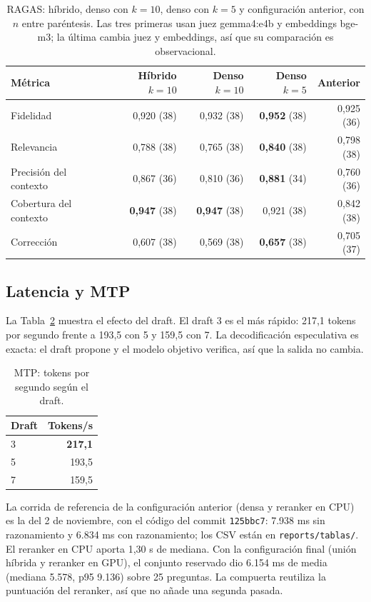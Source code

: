 \begin{table}[t]
\centering
\footnotesize
\caption{RAGAS: h\'ibrido, denso con $k=10$, denso con $k=5$ y configuraci\'on anterior, con $n$ entre par\'entesis. Las tres primeras usan juez gemma4:e4b y embeddings bge-m3; la \'ultima cambia juez y embeddings, as\'i que su comparaci\'on es observacional.}
\label{tab:ragas}
\begin{tabular}{lrrrr}
\toprule
M\'etrica & H\'ibrido $k=10$ & Denso $k=10$ & Denso $k=5$ & Anterior \\
\midrule
Fidelidad & 0,920 (38) & 0,932 (38) & \textbf{0,952} (38) & 0,925 (36) \\
Relevancia & 0,788 (38) & 0,765 (38) & \textbf{0,840} (38) & 0,798 (38) \\
Precisi\'on del contexto & 0,867 (36) & 0,810 (36) & \textbf{0,881} (34) & 0,760 (36) \\
Cobertura del contexto & \textbf{0,947} (38) & \textbf{0,947} (38) & 0,921 (38) & 0,842 (38) \\
Correcci\'on & 0,607 (38) & 0,569 (38) & \textbf{0,657} (38) & 0,705 (37) \\
\bottomrule
\end{tabular}
\end{table}

\subsection{Latencia y MTP}

La Tabla~\ref{tab:mtp} muestra el efecto del draft. El draft 3 es el m\'as r\'apido: 217,1 tokens por segundo frente a 193,5 con 5 y 159,5 con 7. La decodificaci\'on especulativa es exacta: el draft propone y el modelo objetivo verifica, as\'i que la salida no cambia.

\begin{table}[t]
\centering
\footnotesize
\caption{MTP: tokens por segundo seg\'un el draft.}
\label{tab:mtp}
\begin{tabular}{lr}
\toprule
Draft & Tokens/s \\
\midrule
3 & \textbf{217,1} \\
5 & 193,5 \\
7 & 159,5 \\
\bottomrule
\end{tabular}
\end{table}

La corrida de referencia de la configuraci\'on anterior (densa y reranker en CPU) es la del 2 de noviembre, con el c\'odigo del commit \texttt{125bbc7}: 7.938 ms sin razonamiento y 6.834 ms con razonamiento; los CSV est\'an en \texttt{reports/tablas/}. El reranker en CPU aporta 1,30 s de mediana. Con la configuraci\'on final (uni\'on h\'ibrida y reranker en GPU), el conjunto reservado dio 6.154 ms de media (mediana 5.578, p95 9.136) sobre 25 preguntas. La compuerta reutiliza la puntuaci\'on del reranker, as\'i que no a\~nade una segunda pasada.

